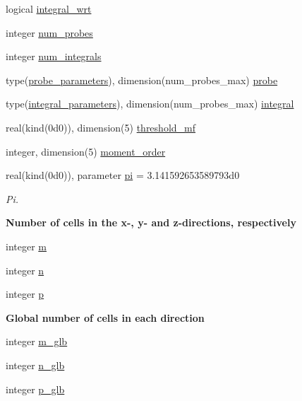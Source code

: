 \begin{DoxyCompactItemize}
\item 
logical \hyperlink{namespacem__global__parameters_a530bdd6416ce213046d14488fb48dbc2}{integral\+\_\+wrt}
\item 
integer \hyperlink{namespacem__global__parameters_aa4e0d015d4064b37e132c5088089394d}{num\+\_\+probes}
\item 
integer \hyperlink{namespacem__global__parameters_a7a86e6e9d4c8b59d28b7404d836fdee8}{num\+\_\+integrals}
\item 
type(\hyperlink{structm__derived__types_1_1probe__parameters}{probe\+\_\+parameters}), dimension(num\+\_\+probes\+\_\+max) \hyperlink{namespacem__global__parameters_a028c7e09aaa23dc9ee8844febffed3af}{probe}
\item 
type(\hyperlink{structm__derived__types_1_1integral__parameters}{integral\+\_\+parameters}), dimension(num\+\_\+probes\+\_\+max) \hyperlink{namespacem__global__parameters_ac1d4fc341c170b243af0d776ad7ede02}{integral}
\item 
real(kind(0d0)), dimension(5) \hyperlink{namespacem__global__parameters_a38317a39628eb007769f26f29b70c958}{threshold\+\_\+mf}
\item 
integer, dimension(5) \hyperlink{namespacem__global__parameters_a4ddb20fdeec324ed6100359e83111a7c}{moment\+\_\+order}
\item 
real(kind(0d0)), parameter \hyperlink{namespacem__global__parameters_a21765a90c01d221524670d1344b126cd}{pi} = 3.\+141592653589793d0
\begin{DoxyCompactList}\small\item\em Pi. \end{DoxyCompactList}\end{DoxyCompactItemize}
\begin{Indent}\textbf{ Number of cells in the x-\/, y-\/ and z-\/directions, respectively}\par
\begin{DoxyCompactItemize}
\item 
integer \hyperlink{namespacem__global__parameters_aee38c9d03e9195858a93ec611b605f33}{m}
\item 
integer \hyperlink{namespacem__global__parameters_ac72422e5f77149bd32cf0cfd01a36544}{n}
\item 
integer \hyperlink{namespacem__global__parameters_ac040dbf547e6d5de8df08e864d8131e7}{p}
\end{DoxyCompactItemize}
\end{Indent}
\begin{Indent}\textbf{ Global number of cells in each direction}\par
\begin{DoxyCompactItemize}
\item 
integer \hyperlink{namespacem__global__parameters_ad4e160df8d0de7ea1801a1ca29f8e9b0}{m\+\_\+glb}
\item 
integer \hyperlink{namespacem__global__parameters_adab11dab474410541d4c37725bea01e1}{n\+\_\+glb}
\item 
integer \hyperlink{namespacem__global__parameters_a1072f221ca8e41b0ea3240b33374cc1e}{p\+\_\+glb}
\end{DoxyCompactItemize}
\end{Indent}
